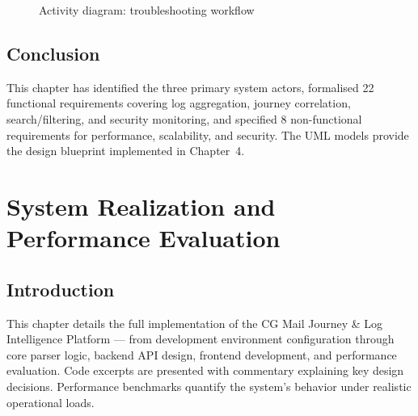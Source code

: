 \documentclass[12pt,a4paper,oneside]{report}
\begin{document}
\begin{figure}[H]
\caption{Activity diagram: troubleshooting workflow}
\label{fig:activity-troubleshoot}
\end{figure}

\section{Conclusion}

This chapter has identified the three primary system actors, formalised 22 functional requirements covering log aggregation, journey correlation, search/filtering, and security monitoring, and specified 8 non-functional requirements for performance, scalability, and security.
The UML models provide the design blueprint implemented in Chapter~4.

\chapter{System Realization and Performance Evaluation}

\section{Introduction}

This chapter details the full implementation of the CG Mail Journey \& Log Intelligence Platform --- from development environment configuration through core parser logic, backend API design, frontend development, and performance evaluation.
Code excerpts are presented with commentary explaining key design decisions.
Performance benchmarks quantify the system's behavior under realistic operational loads.
\end{document}
